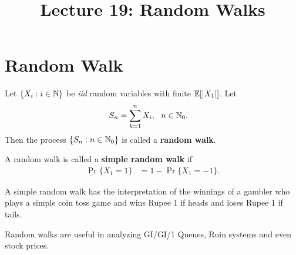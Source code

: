 \documentclass[a4paper,10pt,english]{article}
\title{Lecture 19: Random Walks}
\author{}
\begin{document}
\maketitle
\section{Random Walk}
\begin{defn} Let $\{X_i: i \in \mathbb{N}\}$ be \textit{iid} random variables with finite $\mathbb{E}[|X_1|]$. Let
\begin{align*}
S_n &= \sum_{k=1}^n X_i, ~~n \in \mathbb{N}_0.
\end{align*}
Then the process $\{S_n: n \in \mathbb{N}_0\}$ is called a \textbf{random walk}. 
\end{defn}
\begin{defn} A random walk is called a \textbf{simple random walk} if
\begin{align*}
\Pr\{X_1 = 1\} &= 1- \Pr\{X_1 = -1\}.
\end{align*}
\end{defn}
\begin{rem} A simple random walk has the interpretation of the winnings of a gambler who plays a simple coin toss game and wins Rupee 1 if heads and loses Rupee 1 if tails. 
\end{rem}
\begin{rem} Random walks are useful in analyzing GI/GI/1 Queues, Ruin systems and even stock prices.
\end{rem}
\end{document}
